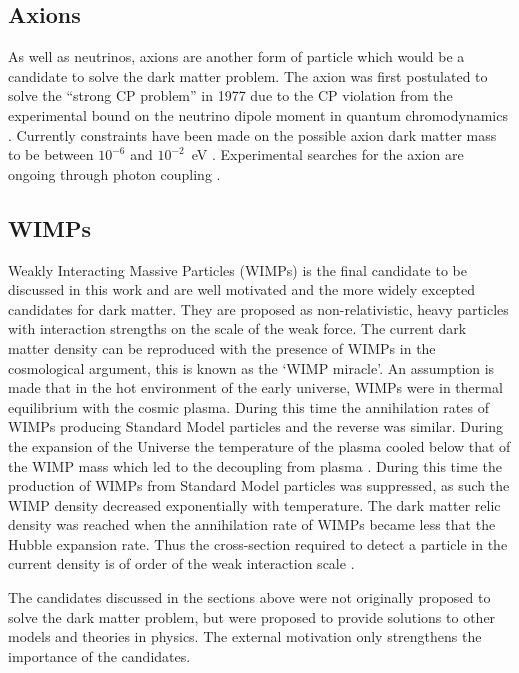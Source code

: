 \subsection{Axions}\label{sec:DMOverview/Axions}
As well as neutrinos, axions are another form of particle which would be a candidate to solve the dark matter problem. The axion was first postulated to solve the ``strong CP problem'' in 1977 \cite{ConsvCP} due to the CP violation from the experimental bound on the neutrino dipole moment in quantum chromodynamics \cite{Hook:2018dlk}. Currently constraints have been made on the possible axion dark matter mass to be between $10^{-6}$ and $10^{-2}$~eV \cite{Duffy:2009ig}. Experimental searches for the axion are ongoing through photon coupling \cite{ADMX:2018gho,JacksonKimball:2017elr}.
\subsection{WIMPs}\label{sec:DMOverview/WIMPs}
Weakly Interacting Massive Particles (WIMPs) is the final candidate to be discussed in this work and are well motivated and the more widely excepted candidates for dark matter. They are proposed as non-relativistic, heavy particles with interaction strengths on the scale of the weak force. The current dark matter density can be reproduced with the presence of WIMPs in the cosmological argument, this is known as the `WIMP miracle'\cite{DMPrimer}. An assumption is made that in the hot environment of the early universe, WIMPs were in thermal equilibrium with the cosmic plasma. During this time the annihilation rates of WIMPs producing Standard Model particles and the reverse was similar. During the expansion of the Universe  the temperature of the plasma cooled below that of the WIMP mass which led to the decoupling from plasma \cite{DMProd}. During this time the production of WIMPs from Standard Model particles was suppressed, as such the WIMP density decreased exponentially with temperature. The dark matter relic density was reached when the annihilation rate of WIMPs became less that the Hubble expansion rate. Thus the cross-section required to detect a particle in the current density is of order of the weak interaction scale \cite{DMProd}.


The candidates discussed in the sections above were not originally proposed to solve the dark matter problem, but were proposed to provide solutions to other models and theories in physics. The external motivation only strengthens the importance of the candidates.


